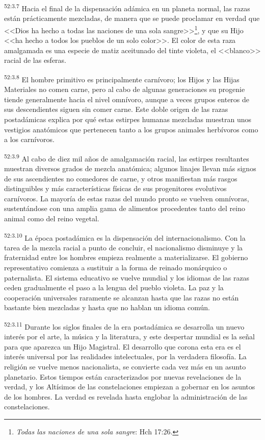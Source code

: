 \par
\textsuperscript{52:3.7} Hacia el final de la dispensación adámica en un planeta normal, las razas están prácticamente mezcladas, de manera que se puede proclamar en verdad que <<Dios ha hecho a todas las naciones de una sola sangre>>\footnote{\textit{Todas las naciones de una sola sangre}: Hch 17:26.}, y que su Hijo <<ha hecho a todos los pueblos de un solo color>>. El color de esta raza amalgamada es una especie de matiz aceitunado del tinte violeta, el <<blanco>> racial de las esferas.

\par
\textsuperscript{52:3.8} El hombre primitivo es principalmente carnívoro; los Hijos y las Hijas Materiales no comen carne, pero al cabo de algunas generaciones su progenie tiende generalmente hacia el nivel omnívoro, aunque a veces grupos enteros de sus descendientes siguen sin comer carne. Este doble origen de las razas postadámicas explica por qué estas estirpes humanas mezcladas muestran unos vestigios anatómicos que pertenecen tanto a los grupos animales herbívoros como a los carnívoros.

\par
\textsuperscript{52:3.9} Al cabo de diez mil años de amalgamación racial, las estirpes resultantes muestran diversos grados de mezcla anatómica; algunos linajes llevan más signos de sus ascendientes no comedores de carne, y otros manifiestan más rasgos distinguibles y más características físicas de sus progenitores evolutivos carnívoros. La mayoría de estas razas del mundo pronto se vuelven omnívoras, sustentándose con una amplia gama de alimentos procedentes tanto del reino animal como del reino vegetal.

\par
\textsuperscript{52:3.10} La época postadámica es la dispensación del internacionalismo. Con la tarea de la mezcla racial a punto de concluir, el nacionalismo disminuye y la fraternidad entre los hombres empieza realmente a materializarse. El gobierno representativo comienza a sustituir a la forma de reinado monárquico o paternalista. El sistema educativo se vuelve mundial y los idiomas de las razas ceden gradualmente el paso a la lengua del pueblo violeta. La paz y la cooperación universales raramente se alcanzan hasta que las razas no están bastante bien mezcladas y hasta que no hablan un idioma común.

\par
\textsuperscript{52:3.11} Durante los siglos finales de la era postadámica se desarrolla un nuevo interés por el arte, la música y la literatura, y este despertar mundial es la señal para que aparezca un Hijo Magistral. El desarrollo que corona esta era es el interés universal por las realidades intelectuales, por la verdadera filosofía. La religión se vuelve menos nacionalista, se convierte cada vez más en un asunto planetario. Estos tiempos están caracterizados por nuevas revelaciones de la verdad, y los Altísimos de las constelaciones empiezan a gobernar en los asuntos de los hombres. La verdad es revelada hasta englobar la administración de las constelaciones.

